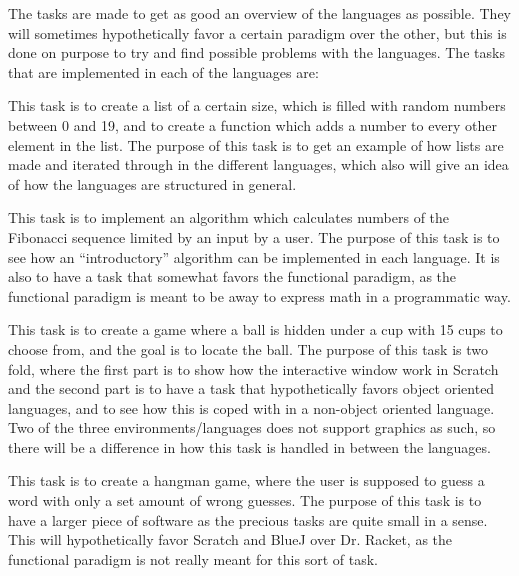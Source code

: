 The tasks are made to get as good an overview of the languages as possible. They will sometimes hypothetically favor a certain paradigm over the other, but this is done on purpose to try and find possible problems with the languages. The tasks that are implemented in each of the languages are:
\begin{description}[style=nextline]
\item[Task 1: Iterator] This task is to create a list of a certain size, which is filled with random numbers between 0 and 19, and to create a function which adds a number to every other element in the list. The purpose of this task is to get an example of how lists are made and iterated through in the different languages, which also will give an idea of how the languages are structured in general.
\item[Task 2: Fibonacci Sequence] This task is to implement an algorithm which calculates numbers of the Fibonacci sequence limited by an input by a user. The purpose of this task is to see how an ``introductory'' algorithm can be implemented in each language. It is also to have a task that somewhat favors the functional paradigm, as the functional paradigm is meant to be away to express math in a programmatic way.
\item[Task 3: Cups and Ball] This task is to create a game where a ball is hidden under a cup with 15 cups to choose from, and the goal is to locate the ball. The purpose of this task is two fold, where the first part is to show how the interactive window work in Scratch and the second part is to have a task that hypothetically favors object oriented languages, and to see how this is coped with in a non-object oriented language. Two of the three environments/languages does not support graphics as such, so there will be a difference in how this task is handled in between the languages.
\item[Task 4: Hangman] This task is to create a hangman game, where the user is supposed to guess a word with only a set amount of wrong guesses. The purpose of this task is to have a larger piece of software as the precious tasks are quite small in a sense. This will hypothetically favor Scratch and BlueJ over Dr. Racket, as the functional paradigm is not really meant for this sort of task.
\end{description}


